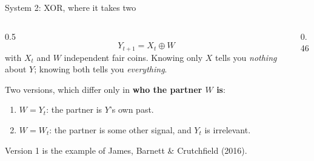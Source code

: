 \documentclass[aspectratio=169,11pt,xcolor={table}]{beamer}
\newcommand{\Xt}{X_t}
\newcommand{\Yt}{Y_t}
\newcommand{\Yn}{Y_{t+1}}
\newcommand{\aside}[1]{{\color{muted}\small #1}}
\begin{document}
\begin{frame}{System 2: XOR, where it takes two}
  \begin{columns}[c]
    \begin{column}{0.5\textwidth}
      \[ \Yn = \Xt \oplus W \]
      with $\Xt$ and $W$ independent fair coins. Knowing only $X$ tells you \emph{nothing}
      about $Y$; knowing both tells you \emph{everything}.
      \medskip

      Two versions, which differ only in \textbf{who the partner $W$ is}:
      \begin{enumerate}
        \item $W = \Yt$: the partner is $Y$'s own past.
        \item $W = W_t$: the partner is some other signal, and $\Yt$ is irrelevant.
      \end{enumerate}
      \aside{Version 1 is the example of James, Barnett \& Crutchfield (2016).}
    \end{column}
    \begin{column}{0.46\textwidth}
      \centering
    \end{column}
  \end{columns}
\end{frame}
\end{document}
